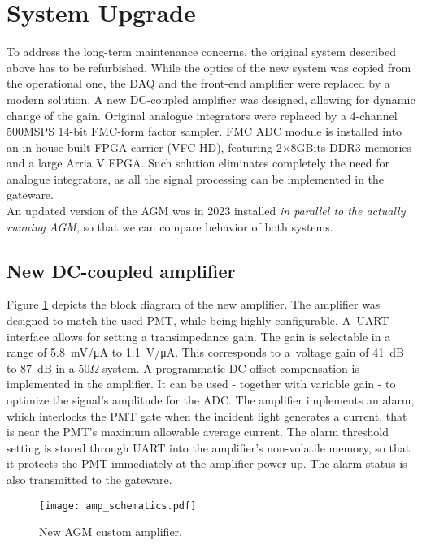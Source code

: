\section{System Upgrade}
To address the long-term maintenance concerns, the original system described above has to be refurbished. 
%
While the optics of the new system was copied from the operational one, the DAQ and the front-end amplifier were replaced by a modern solution.
%
A new DC-coupled amplifier was designed, allowing for dynamic change of the gain.
%
Original analogue integrators were replaced by a 4-channel 500MSPS 14-bit FMC-form factor sampler.
%
FMC ADC module is installed into an in-house built FPGA carrier (VFC-HD), featuring 2$\times 8$GBits DDR3 memories and a large Arria V FPGA.
%
Such solution eliminates completely the need for analogue integrators, as all the signal processing can be implemented in the gateware.  
\\
An updated version of the AGM was in 2023 installed \textit{in parallel to the actually running AGM}, so that we can compare behavior of both systems.

\subsection{New DC-coupled amplifier}

Figure \ref{fig:amp_schematics} depicts the block diagram of the new amplifier.
%
The amplifier was designed to match the used PMT, while being highly configurable.
%
A~UART interface allows for setting a transimpedance gain.
%
The gain is selectable in a range of \SI{5.8}{mV/\micro A} to \SI{1.1}{V/\micro A}.
%
This corresponds to a~voltage gain of \SI{41}{dB} to \SI{87}{dB} in a $50\Omega$ system.
%
A programmatic DC-offset compensation is implemented in the amplifier.
%
It can be used - together with variable gain - to optimize the signal's amplitude for the ADC.
%
The amplifier implements an alarm, which interlocks the PMT gate when the incident light generates a current, that is near the PMT's maximum allowable average current.
%
The alarm threshold setting is stored through UART into the amplifier's non-volatile memory, so that it protects the PMT immediately at the amplifier power-up.
%
The alarm status is also transmitted to the gateware.
%
\begin{figure}[!tbh]
    \centering
    \texttt{[image: amp\_schematics.pdf]}
    \caption{New AGM custom amplifier.}
    \label{fig:amp_schematics}
\end{figure}
%
